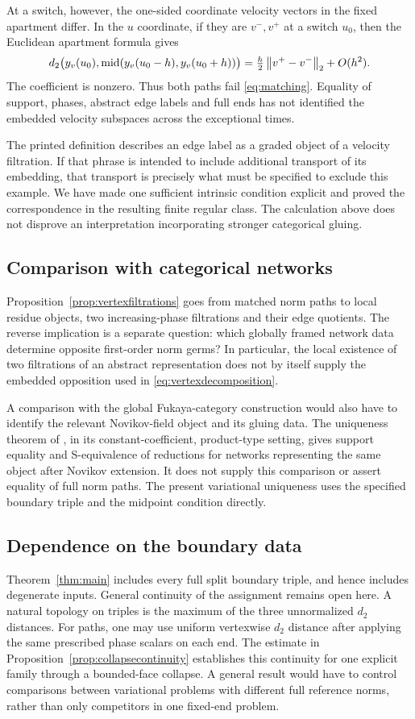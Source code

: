 At a switch, however, the one-sided coordinate velocity
vectors in the fixed apartment differ. In the $u$ coordinate,
if they are $v^-,v^+$ at a switch $u_0$, then the Euclidean
apartment formula gives
\[
 d_2\bigl(y_v(u_0),\operatorname{mid}(y_v(u_0-h),y_v(u_0+h))\bigr)
       =\tfrac h2\left\lVert v^+-v^-\right\rVert_2+O(h^2).
\]
The coefficient is nonzero. Thus both paths fail
\eqref{eq:matching}. Equality of support, phases, abstract
edge labels and full ends has not identified the embedded
velocity subspaces across the exceptional times.

The printed definition describes an edge label as a graded
object of a velocity filtration. If that phrase is intended
to include additional transport of its embedding, that
transport is precisely what must be specified to exclude
this example. We have made one sufficient intrinsic condition
explicit and proved the correspondence in the resulting
finite regular class. The calculation above does not disprove
an interpretation incorporating stronger categorical gluing.

\subsection{Comparison with categorical networks}
Proposition~\ref{prop:vertexfiltrations} goes from matched norm
paths to local residue objects, two increasing-phase filtrations
and their edge quotients. The reverse implication is a separate
question: which globally framed network data determine opposite
first-order norm germs? In particular, the local existence of
two filtrations of an abstract representation does not by itself
supply the embedded opposition used in
\eqref{eq:vertexdecomposition}.

A comparison with the global Fukaya-category construction would
also have to identify the relevant Novikov-field object and its
gluing data. The uniqueness theorem of
\cite[Theorem~4.15]{HKS24}, in its constant-coefficient,
product-type setting, gives support equality and S-equivalence
of reductions for networks representing the same object after
Novikov extension. It does not supply this comparison or assert
equality of full norm paths. The present variational uniqueness
uses the specified boundary triple and the midpoint condition
directly.

\subsection{Dependence on the boundary data}
Theorem~\ref{thm:main} includes every full split boundary triple,
and hence includes degenerate inputs. General continuity of the
assignment remains open here. A natural topology on triples is
the maximum of the three unnormalized $d_2$ distances. For paths,
one may use uniform vertexwise $d_2$ distance after applying the
same prescribed phase scalars on each end. The estimate in
Proposition~\ref{prop:collapsecontinuity} establishes this
continuity for one explicit family through a bounded-face
collapse. A general result would have to control comparisons
between variational problems with different full reference
norms, rather than only competitors in one fixed-end problem.

